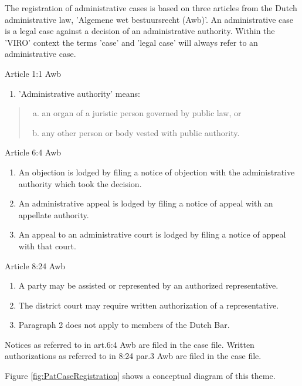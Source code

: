 \documentclass[10pt,a4paper]{report}              %
\theoremstyle{plain}\theorembodyfont{\rmfamily}\newtheorem{definition}{Definition}[section]
\theoremstyle{plain}\theorembodyfont{\rmfamily}\newtheorem{designrule}[definition]{Requirement}
\begin{document}
The registration of administrative cases is based on three articles from
the Dutch administrative law, 'Algemene wet bestuursrecht (Awb)'. An
administrative case is a legal case against a decision of an
administrative authority. Within the 'VIRO' context the terms 'case' and
'legal case' will always refer to an administrative case.

Article 1:1 Awb

\begin{enumerate}[1.]
\item
  'Administrative authority' means:
\end{enumerate}
\begin{quote}
\begin{enumerate}[a.]
\item
  an organ of a juristic person governed by public law, or
\item
  any other person or body vested with public authority.
\end{enumerate}
\end{quote}
Article 6:4 Awb

\begin{enumerate}[1.]
\item
  An objection is lodged by filing a notice of objection with the
  administrative authority which took the decision.
\item
  An administrative appeal is lodged by filing a notice of appeal with
  an appellate authority.
\item
  An appeal to an administrative court is lodged by filing a notice of
  appeal with that court.
\end{enumerate}
Article 8:24 Awb

\begin{enumerate}[1.]
\item
  A party may be assisted or represented by an authorized
  representative.
\item
  The district court may require written authorization of a
  representative.
\item
  Paragraph 2 does not apply to members of the Dutch Bar.
\end{enumerate}
Notices as referred to in art.6:4 Awb are filed in the case file.
Written authorizations as referred to in 8:24 par.3 Awb are filed in the
case file.

Figure \ref{fig:PatCaseRegistration} shows a conceptual diagram of this theme.
\end{document}
